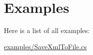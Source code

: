 \section{Examples}
Here is a list of all examples\+:\begin{DoxyCompactItemize}
\item 
\hyperlink{examples_2_save_xml_to_file_8cs-example}{examples/\+Save\+Xml\+To\+File.\+cs}
\end{DoxyCompactItemize}
